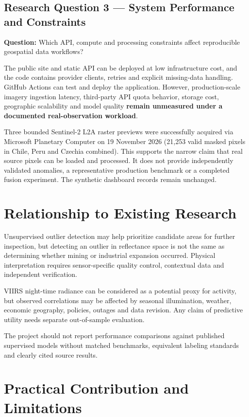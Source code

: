 \subsection{Research Question 3 — System Performance and Constraints}

\textbf{Question:} Which API, compute and processing constraints affect reproducible geospatial data workflows?

The public site and static API can be deployed at low infrastructure cost, and the code contains provider clients, retries and explicit missing-data handling. GitHub Actions can test and deploy the application. However, production-scale imagery ingestion latency, third-party API quota behavior, storage cost, geographic scalability and model quality \textbf{remain unmeasured under a documented real-observation workload}.

Three bounded Sentinel-2 L2A raster previews were successfully acquired via Microsoft Planetary Computer on 19 November 2026 (21,253 valid masked pixels in Chile, Peru and Czechia combined). This supports the narrow claim that real source pixels can be loaded and processed. It does not provide independently validated anomalies, a representative production benchmark or a completed fusion experiment. The synthetic dashboard records remain unchanged.

\section{Relationship to Existing Research}

Unsupervised outlier detection may help prioritize candidate areas for further inspection, but detecting an outlier in reflectance space is not the same as determining whether mining or industrial expansion occurred. Physical interpretation requires sensor-specific quality control, contextual data and independent verification.

VIIRS night-time radiance can be considered as a potential proxy for activity, but observed correlations may be affected by seasonal illumination, weather, economic geography, policies, outages and data revision. Any claim of predictive utility needs separate out-of-sample evaluation.

The project should not report performance comparisons against published supervised models without matched benchmarks, equivalent labeling standards and clearly cited source results.

\section{Practical Contribution and Limitations}

